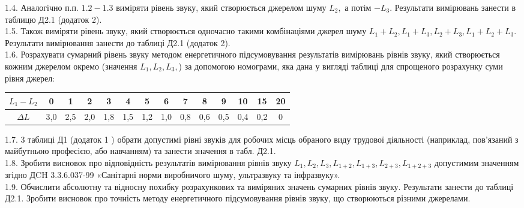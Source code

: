 \documentclass[a4paper,14pt]{extreport}
\begin{document}
1.4. Аналогічно п.п. $1.2-1.3$ виміряти рівень звуку, який створюється
джерелом шуму $L_{2},$ а потім $-L_{3} .$ Результати вимірювань занести в таблицю Д2.1 (додаток 2). \\

1.5. Також виміряти рівень звуку, який створюється одночасно такими комбінаціями джерел шуму $L_{1}+L_{2}, L_{1}+L_{3}, L_{2}+L_{3}, L_{1}+L_{2}+L_{3} .$ Результати вимірювання занести до таблиці Д2.1 (додаток 2).\\

1.6. Розрахувати сумарний рівень звуку методом енергетичного підсумовування результатів вимірювань рівнів звуку, який створюється кожним джерелом окремо (значення $L_{1}, L_{2}, L_{3},$) за допомогою номограми, яка дана у вигляді таблиці для спрощеного розрахунку суми рівня джерел:
\vspace{1cm}

\begin{tabular}{|c|c|c|c|c|c|c|c|c|c|c|c|c|c|}
\hline$L_{1}-L_{2}$ & 0 & 1 & 2 & 3 & 4 & 5 & 6 & 7 & 8 & 9 & 10 & 15 & 20 \\
\hline$\Delta L$ & 3,0 & 2,5 & 2,0 & 1,8 & 1,5 & 1,2 & 1,0 & 0,8 & 0,6 & 0,5 & 0,4 & 0,2 & 0 \\
\hline
\end{tabular}
\vspace{1cm}

1.7. 3 таблиці Д1 (додаток 1 ) обрати допустимі рівні звуків для робочих місць обраного виду трудової діяльності (наприклад, пов'язаний з майбутньою професією, або навчанням) та занести значення в табл. Д2.1.\\

1.8. Зробити висновок про відповідність результатів вимірювання рівнів звуку $L_{1}, L_{2}, L_{3}, L_{1+2}, L_{1+3}, L_{2+3}, L_{1+2+3}$ допустимим значенням згідно $Д \mathrm{CH}$ 3.3.6.037-99 «Санітарні норми виробничого шуму, ультразвуку та інфразвуку».\\

1.9. Обчислити абсолютну та відносну похибку розрахункових та виміряних значень сумарних рівнів звуку. Результати занести до таблиці Д2.1. Зробити висновок про точність методу енергетичного підсумовування рівнів звуку, що створюються різними джерелами.
\end{document}
